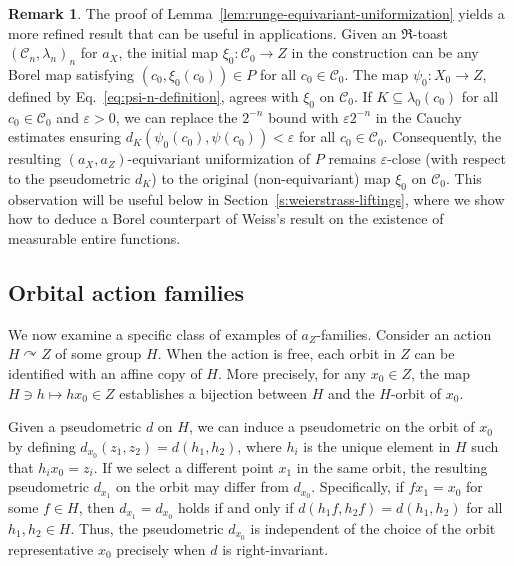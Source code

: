 \documentclass[12pt]{paper}
\numberwithin{equation}{section}
\theoremstyle{plain}
\theoremstyle{definition}
\newtheorem{remark}[theorem]{Remark}
\newcommand{\mfR}{\mathfrak{R}}
\newcommand{\acts}{\curvearrowright}
\renewcommand{\epsilon}{\varepsilon}
\begin{document}
\begin{remark}
  \label{rem:close-to-uniformization}
  The proof of Lemma~\ref{lem:runge-equivariant-uniformization} yields a more refined result that
  can be useful in applications. Given an \(\mfR\)-toast \((\mathcal{C}_{n}, \lambda_{n})_{n}\) for
  \(a_{X}\), the initial map \(\xi_{0} \colon \mathcal{C}_{0} \to Z\) in the construction can be any
  Borel map satisfying \((c_{0}, \xi_{0}(c_{0})) \in P\) for all \(c_{0} \in \mathcal{C}_{0}\). The
  map \(\psi_{0} \colon X_{0} \to Z\), defined by Eq.~\eqref{eq:psi-n-definition}, agrees with
  \(\xi_{0}\) on \(\mathcal{C}_{0}\). If \(K \subseteq \lambda_{0}(c_{0})\) for all
  \(c_{0} \in \mathcal{C}_{0}\) and \(\epsilon > 0\), we can replace the \(2^{-n}\) bound with
  \(\epsilon 2^{-n}\) in the Cauchy estimates ensuring
  \(d_{K}(\psi_{0}(c_{0}), \psi(c_{0})) < \epsilon\) for all \(c_{0} \in
  \mathcal{C}_{0}\). Consequently, the resulting \((a_{X}, a_{Z})\)-equivariant uniformization of
  \(P\) remains \(\epsilon\)-close (with respect to the pseudometric \(d_{K}\)) to the original
  (non-equivariant) map \(\xi_{0}\) on \(\mathcal{C}_{0}\). This observation will be useful below
  in Section~\ref{s:weierstrass-liftings}, where we show how to deduce a Borel counterpart
  of Weiss's result on the existence of measurable entire functions.
\end{remark}

\subsection{Orbital action families}
\label{sec:semidirect-products}

We now examine a specific class of examples of \(a_{Z}\)-families. Consider an action \(H \acts Z\)
of some group \(H\).  When the action is free, each orbit in \(Z\) can be identified with an affine
copy of \(H\). More precisely, for any \(x_{0} \in Z\), the map \(H \ni h \mapsto hx_{0} \in Z\)
establishes a bijection between \(H\) and the \(H\)-orbit of \(x_{0}\).

Given a pseudometric \(d\) on \(H\), we can induce a pseudometric on the orbit of \(x_{0}\) by
defining \(d_{x_{0}}(z_{1}, z_{2}) = d(h_{1}, h_{2})\), where \(h_{i}\) is the unique element in
\(H\) such that \(h_{i}x_{0} = z_{i}\). If we select a different point \(x_{1}\) in the same orbit,
the resulting pseudometric \(d_{x_{1}}\) on the orbit may differ from \(d_{x_{0}}\). Specifically,
if \(fx_{1} = x_{0}\) for some \(f \in H\), then \(d_{x_{1}} = d_{x_{0}}\) holds if and only if
\(d(h_{1}f, h_{2}f) = d(h_{1}, h_{2})\) for all \(h_{1}, h_{2} \in H\).  Thus, the pseudometric
\(d_{x_{0}}\) is independent of the choice of the orbit representative \(x_{0}\) precisely when
\(d\) is right-invariant.
\end{document}
